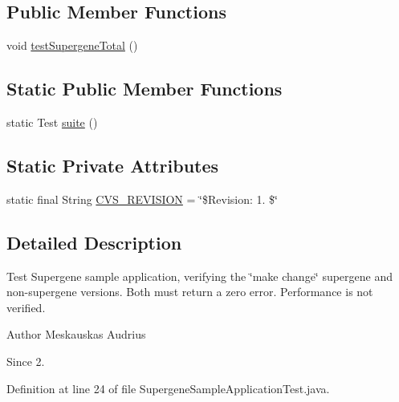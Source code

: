 \subsection*{Public Member Functions}
\begin{DoxyCompactItemize}
\item 
void \hyperlink{classexamples_1_1supergene_1_1_supergene_sample_application_test_a8e4e0968d8fdd6c208bad1fa767ed4d3}{test\-Supergene\-Total} ()
\end{DoxyCompactItemize}
\subsection*{Static Public Member Functions}
\begin{DoxyCompactItemize}
\item 
static Test \hyperlink{classexamples_1_1supergene_1_1_supergene_sample_application_test_a1b7b92d3060f1f7b3faee9f93d34a390}{suite} ()
\end{DoxyCompactItemize}
\subsection*{Static Private Attributes}
\begin{DoxyCompactItemize}
\item 
static final String \hyperlink{classexamples_1_1supergene_1_1_supergene_sample_application_test_ab9449f9a3118b8b9d1ead38ccc27ad50}{C\-V\-S\-\_\-\-R\-E\-V\-I\-S\-I\-O\-N} = \char`\"{}\$Revision\-: 1. \$\char`\"{}
\end{DoxyCompactItemize}


\subsection{Detailed Description}
Test Supergene sample application, verifying the \char`\"{}make change\char`\"{} supergene and non-\/supergene versions. Both must return a zero error. Performance is not verified.

\begin{DoxyAuthor}{Author}
Meskauskas Audrius 
\end{DoxyAuthor}
\begin{DoxySince}{Since}
2. 
\end{DoxySince}


Definition at line 24 of file Supergene\-Sample\-Application\-Test.\-java.



